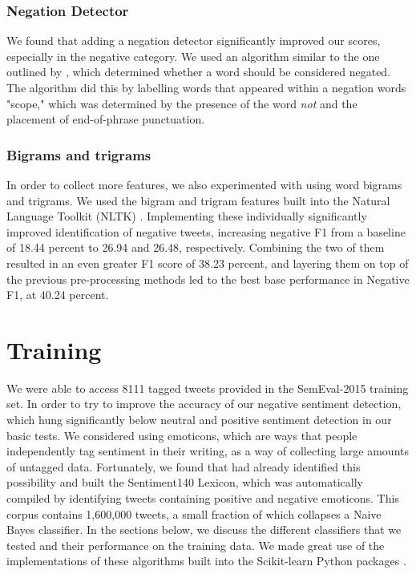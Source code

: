 \subsubsection{Negation Detector}
We found that adding a negation detector significantly improved our scores, especially in the negative category.  We used an algorithm similar to the one outlined by \citet{potts}, which determined whether a word should be considered negated.  The algorithm did this by labelling words that appeared within a negation words "scope," which was determined by the presence of the word \textit{not} and the placement of end-of-phrase punctuation.

\subsubsection{Bigrams and trigrams}
In order to collect more features, we also experimented with using word bigrams and trigrams. We used the bigram and trigram features built into the Natural Language Toolkit (NLTK) \citep{nltk}.
Implementing these individually significantly improved identification of negative tweets, increasing negative F1 from a baseline of 18.44 percent to 26.94 and 26.48, respectively. Combining the two of them resulted in an even greater F1 score of 38.23 percent, and layering them on top of the previous pre-processing methods led to the best base performance in Negative F1, at 40.24 percent. 

\section{Training}
We were able to access 8111 tagged tweets provided in the SemEval-2015 training set. In order to try to improve the accuracy of our negative sentiment detection, which hung significantly below neutral and positive sentiment detection in our basic tests. We considered using emoticons, which are ways that people independently tag sentiment in their writing, as a way of collecting large amounts of untagged data. Fortunately, we found that \citet{go} had already identified this possibility and built the Sentiment140 Lexicon, which was automatically compiled by identifying tweets containing positive and negative emoticons. This corpus contains 1,600,000 tweets, a small fraction of which collapses a Naive Bayes classifier. In the sections below, we discuss the different classifiers that we tested and their performance on the training data. We made great use of the implementations of these algorithms built into the Scikit-learn Python packages \citep{scikit}.

